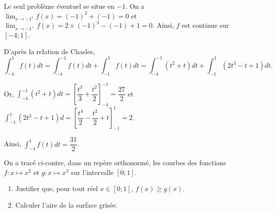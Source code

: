 \documentclass[11pt,fleqn, openany]{book} %
\begin{document}
\begin{solution}

Le seul problème éventuel se situe en \(-1\). On a \(\displaystyle\lim_{x \to -1^1}f(x)=(-1)^2+(-1)=0\) et \\ \(\displaystyle\lim_{x \to -1^+}f(x)=2 \times (-1)^3-(-1)+1=0\). Ainsi, \(f\) est continue sur \([-4;1]\). 

 D'après la relation de Chasles,\[\displaystyle\int_{-4}^1 f(t)dt = \displaystyle\int_{-4}^{-1} f(t)dt+\displaystyle\int_{-1}^1 f(t)dt = \displaystyle\int_{-4}^{-1} (t^2+t)dt
+\displaystyle\int_{-1}^1 (2t^3-t+1)dt .\]

Or, \( \displaystyle\int_{-4}^{-1} (t^2+t)dt = \left[ \dfrac{t^3}{3}+\dfrac{t^2}{2}\right]_{-4}^{-1}=\dfrac{27}{2}\) et \(\displaystyle\int_{-1}^1 (2t^3-t+1)d=\left[\dfrac{t^4}{2}-\dfrac{t^2}{2}+t\right]_{-1}^1=2\).

Ainsi, \(\displaystyle\int_{-4}^1 f(t)dt=\dfrac{31}{2}\).\end{solution} 



\begin{exercise}
 \begin{minipage}{0.7\linewidth}
 On a tracé ci-contre, dans un repère orthonormé, les courbes des fonctions $f :x\mapsto x^2$ et $g:x \mapsto x^3$ sur l'intervalle $[0;1]$.
\begin{enumerate}
\item Justifier que, pour tout réel $x\in [0;1]$, $f(x)\geqslant g(x)$.
\item Calculer l'aire de la surface grisée.
\end{enumerate}

\end{minipage}\hfill \begin{minipage}{0.25\linewidth}
\end{minipage}
\end{exercise}
\end{document}
